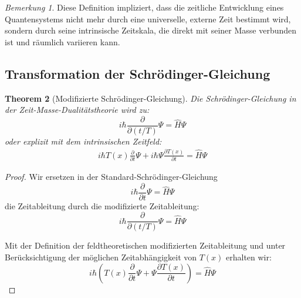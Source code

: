 \documentclass{article}
\newtheorem{theorem}{Theorem}[section]
\theoremstyle{definition}
\theoremstyle{remark}
\newtheorem{remark}[theorem]{Bemerkung}
\newcommand{\Tfield}{T(x)} %
\begin{document}
		\begin{remark}
			Diese Definition impliziert, dass die zeitliche Entwicklung eines Quantensystems nicht mehr durch eine universelle, externe Zeit bestimmt wird, sondern durch seine intrinsische Zeitskala, die direkt mit seiner Masse verbunden ist und räumlich variieren kann.
		\end{remark}
		
		\subsection{Transformation der Schrödinger-Gleichung}
		
		\begin{theorem}[Modifizierte Schrödinger-Gleichung]
			Die Schrödinger-Gleichung in der Zeit-Masse-Dualitätstheorie wird zu:
			\begin{equation}
				i\hbar \frac{\partial}{\partial(t/T)}\Psi = \hat{H}\Psi
			\end{equation}
			oder explizit mit dem intrinsischen Zeitfeld:
			\begin{multline}
				i\hbar \Tfield\frac{\partial}{\partial t}\Psi + i\hbar\Psi\frac{\partial \Tfield}{\partial t} = \hat{H}\Psi
			\end{multline}
		\end{theorem}
		
		\begin{proof}
			Wir ersetzen in der Standard-Schrödinger-Gleichung
			\begin{equation}
				i\hbar \frac{\partial}{\partial t}\Psi = \hat{H}\Psi
			\end{equation}
			die Zeitableitung durch die modifizierte Zeitableitung:
			\begin{equation}
				i\hbar \frac{\partial}{\partial(t/T)}\Psi = \hat{H}\Psi
			\end{equation}
			
			Mit der Definition der feldtheoretischen modifizierten Zeitableitung und unter Berücksichtigung der möglichen Zeitabhängigkeit von $\Tfield$ erhalten wir:
			\begin{equation}
				i\hbar (\Tfield\frac{\partial}{\partial t}\Psi + \Psi\frac{\partial \Tfield}{\partial t}) = \hat{H}\Psi
			\end{equation}
		\end{proof}
		
\end{document}
